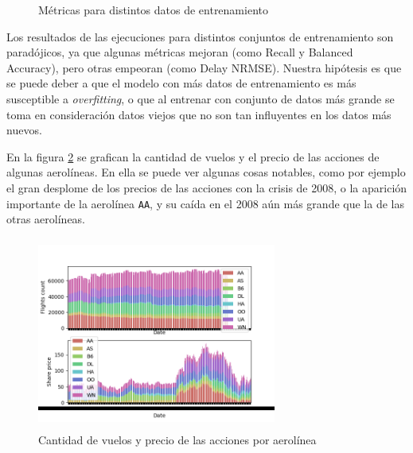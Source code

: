\begin{figure}
\begin{center}
\end{center}
\caption{M\'etricas para distintos datos de entrenamiento}
\label{table:metrics}
\end{figure}
Los resultados de las ejecuciones para distintos conjuntos de entrenamiento son parad\'ojicos, ya
que algunas m\'etricas mejoran (como Recall y Balanced Accuracy), pero otras empeoran
(como Delay NRMSE). Nuestra hip\'otesis es que se puede deber a que el modelo con m\'as datos
de entrenamiento es m\'as susceptible a \textit{overfitting}, o que al entrenar con conjunto de datos
m\'as grande se toma en consideraci\'on datos viejos que no son tan influyentes en los datos m\'as nuevos.

En la figura \ref{fig:flights_and_stock_prices} se grafican la cantidad de vuelos y el precio de las acciones
de algunas aerol\'ineas. En ella se puede ver algunas cosas notables, como por ejemplo el gran desplome
de los precios de las acciones con la crisis de 2008, o la aparici\'on importante de la aerol\'inea \texttt{AA},
y su ca\'ida en el 2008 a\'un m\'as grande que la de las otras aerol\'ineas.

\begin{figure}[hbtp]
  \centering
  \includegraphics[width=0.7\textwidth, height=2.5in]{plots/flights_and_stock_prices.png}
  \caption{Cantidad de vuelos y precio de las acciones por aerol\'inea}
  \label{fig:flights_and_stock_prices}
\end{figure}

